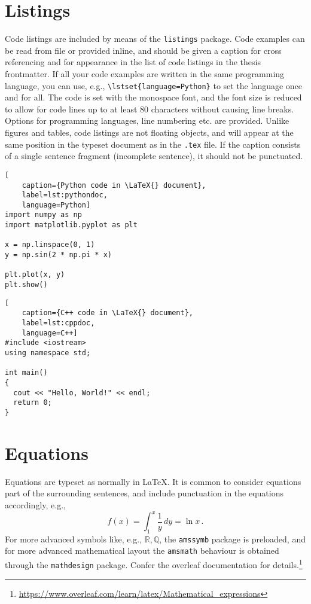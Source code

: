 {{\section{Listings}

Code listings are included by means of the \texttt{listings} package. Code examples can be read from file or provided inline, and should be given a caption for cross referencing and for appearance in the list of code listings in the thesis frontmatter. If all your code examples are written in the same programming language, you can use, e.g., \texttt{\textbackslash lstset\{language=Python\}} to set the language once and for all. The code is set with the monospace font, and the font size is reduced to allow for code lines up to at least 80 characters without causing line breaks. Options for programming languages, line numbering etc. are provided. Unlike figures and tables, code listings are not floating objects, and will appear at the same position in the typeset document as in the \texttt{.tex} file. If the caption consists of a single sentence fragment (incomplete sentence), it should not be punctuated.





\begin{lstlisting}[
    caption={Python code in \LaTeX{} document},
    label=lst:pythondoc,
    language=Python]
import numpy as np
import matplotlib.pyplot as plt

x = np.linspace(0, 1)
y = np.sin(2 * np.pi * x)

plt.plot(x, y)
plt.show()
\end{lstlisting}

\begin{lstlisting}[
    caption={C++ code in \LaTeX{} document},
    label=lst:cppdoc,
    language=C++]
#include <iostream>
using namespace std;

int main()
{
  cout << "Hello, World!" << endl;
  return 0;
}
\end{lstlisting}

\section{Equations}

Equations are typeset as normally in \LaTeX{}. It is common to consider equations part of the surrounding sentences, and include punctuation in the equations accordingly, e.g.,
\begin{equation}
    f(x) = \int_1^x \frac{1}{y}\,dy = \ln x\,.
    \label{eq:logarithm}
\end{equation}
For more advanced symbols like, e.g., $\mathbb{R}, \mathbb{Q}$, the \texttt{amssymb} package is preloaded, and for more advanced mathematical layout the \texttt{amsmath} behaviour is obtained through the \texttt{mathdesign} package. Confer the overleaf documentation for details.\footnote{\url{https://www.overleaf.com/learn/latex/Mathematical_expressions}}

}}

